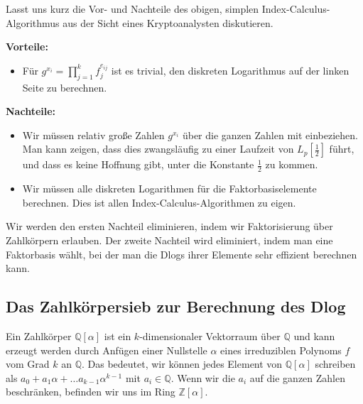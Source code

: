 \begin{refsegment}
Lasst uns kurz die Vor- und Nachteile des obigen, simplen Index-Calculus-Algorithmus aus der Sicht eines Kryptoanalysten diskutieren.

\textbf{Vorteile:}
\begin{itemize}
\item Für $g^{x_i} = \prod_{j=1}^k f_j^{e_{ij}}$ ist es trivial, den diskreten Logarithmus auf der linken Seite zu berechnen.
\end{itemize}

\textbf{Nachteile:}
\begin{itemize}
\item Wir müssen relativ große Zahlen $g^{x_i}$ über die ganzen Zahlen mit einbeziehen. Man kann zeigen, dass dies zwangsläufig zu einer Laufzeit von $L_p[\frac 1 2]$ führt, und dass es keine Hoffnung gibt, unter die Konstante $\frac 1 2$ zu kommen.
\DIFdelbegin %

\DIFdelend \item Wir müssen alle diskreten Logarithmen für die Faktorbasiselemente berechnen. Dies ist allen Index-Calculus-Algorithmen zu eigen.
\end{itemize}

Wir werden den ersten Nachteil eliminieren, indem wir Faktorisierung über Zahlkörpern erlauben.
Der zweite Nachteil wird eliminiert, indem man eine Faktorbasis wählt, bei der man die Dlogs ihrer Elemente sehr effizient berechnen kann.



\subsection[Das Zahlkörpersieb zur Berechnung des Dlog]{Das Zahlkörpersieb zur Berechnung des Dlog\footnotemark}
\label{nfs-dlog}

Ein Zahlkörper $\mathbb{Q}[\alpha]$ ist ein $k$-dimensionaler Vektorraum über $\mathbb{Q}$ und kann erzeugt werden durch Anfügen einer Nullstelle $\alpha$ eines irreduziblen Polynoms $f$ vom Grad $k$ an $\mathbb{Q}$. Das bedeutet, wir können jedes Element von $\mathbb{Q}[\alpha]$ schreiben als $a_0+a_1\alpha + \ldots a_{k-1}\alpha^{k-1}$ mit $a_i \in \mathbb{Q}$. Wenn wir die $a_i$ auf die ganzen Zahlen beschränken, befinden wir uns im Ring $\mathbb{Z}[\alpha]$.


\end{refsegment}
